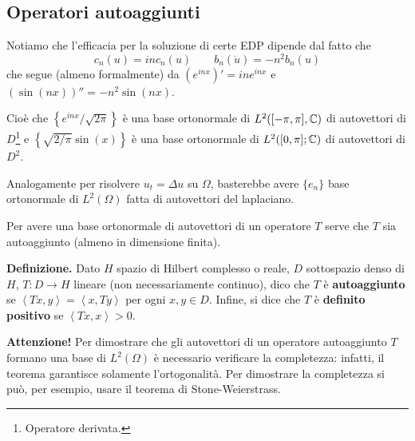 \subsection{Operatori autoaggiunti}

Notiamo che l'efficacia per la soluzione di certe EDP dipende dal fatto che
%
$$
	c_n(u) = in c_n(u) \qquad b_n(\ddot u) = -n^2 b_n(u)
$$
%
che segue (almeno formalmente) da $(e^{inx})' = in e^{inx}$ e $(\sin(nx))'' = -n^2 \sin(nx)$.

Cioè che $\left\{ e^{inx} / \sqrt{2\pi} \right\}$ è una base ortonormale di $L^2([-\pi,\pi],\mathbb C)$ di autovettori di $D$\footnote{Operatore derivata.} e $\left\{ \sqrt{2/\pi} \sin(x)  \right\}$ è una base ortonormale di $L^2([0,\pi];\mathbb C)$ di autovettori di $D^2$.

Analogamente per risolvere $u_t = \Delta u$ su $\Omega$, basterebbe avere $\{ e_n \}$ base ortonormale di $L^2(\Omega)$ fatta di autovettori del laplaciano.

Per avere una base ortonormale di autovettori di un operatore $T$ serve che $T$ sia autoaggiunto (almeno in dimensione finita).

\textbf{Definizione.} Dato $H$ spazio di Hilbert complesso o reale, $D$ sottospazio denso di $H$, $T \colon D \to H$ lineare (non necessariamente continuo), dico che $T$ è \textbf{autoaggiunto} se $\left<Tx,y \right> = \left<x,Ty \right>$ per ogni $x,y \in D$.
Infine, si dice che $T$ è \textbf{definito positivo} se $\left<Tx,x \right> > 0$.


\textbf{Attenzione!} Per dimostrare che gli autovettori di un operatore autoaggiunto $T$ formano una base di $L^2(\Omega)$ è necessario verificare la completezza: infatti, il teorema garantisce solamente l'ortogonalità.
Per dimostrare la completezza si può, per esempio, usare il teorema di Stone-Weierstrass.

